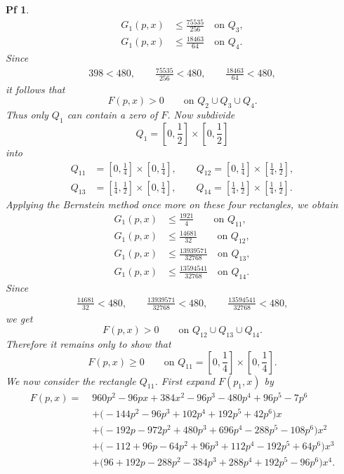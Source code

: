 \documentclass[10pt,a4paper]{amsart}
\newtheorem{pf}{Pf}
\begin{document}
\begin{pf}
\begin{align*}
G_1(p,x) &\le \frac{75535}{256} \quad \text{on } Q_3,\\[2mm]
G_1(p,x) &\le \frac{18463}{64} \quad \text{on } Q_4.
\end{align*}
Since
\begin{align*}
398<480,\qquad \frac{75535}{256}<480,\qquad \frac{18463}{64}<480,
\end{align*}
it follows that
\[
F(p,x)>0
\qquad \text{on }Q_2\cup Q_3\cup Q_4.
\]
Thus only $Q_{1}$ can contain a zero of $F$.
Now subdivide
\[
Q_1=\left[0,\frac12\right]\times\left[0,\frac12\right]
\]
into
\begin{align*}
Q_{11}&=\left[0,\frac14\right]\times\left[0,\frac14\right],\qquad
Q_{12}=\left[0,\frac14\right]\times\left[\frac14,\frac12\right],\\[3mm]
Q_{13}&=\left[\frac14,\frac12\right]\times\left[0,\frac14\right],\qquad
Q_{14}=\left[\frac14,\frac12\right]\times\left[\frac14,\frac12\right].
\end{align*}
Applying the Bernstein method once more on these four rectangles, we obtain
\begin{align*}
G_1(p,x) &\le \frac{1921}{4} \qquad \text{on } Q_{11},\\[2mm]
G_1(p,x) &\le \frac{14681}{32} \qquad \text{on } Q_{12},\\[2mm]
G_1(p,x) &\le \frac{13939571}{32768} \quad \text{on } Q_{13},\\[2mm]
G_1(p,x) &\le \frac{13594541}{32768} \quad \text{on } Q_{14}.
\end{align*}
Since
\begin{align*}
\frac{14681}{32}<480,\qquad
\frac{13939571}{32768}<480,\qquad
\frac{13594541}{32768}<480,
\end{align*}
we get
\[
F(p,x)>0
\qquad \text{on }Q_{12}\cup Q_{13}\cup Q_{14}.
\]
Therefore it remains only to show that
\[
F(p,x)\ge 0
\qquad \text{on }Q_{11}=\left[0,\frac14\right]\times\left[0,\frac14\right].
\]
We now consider the rectangle $Q_{11}$.
First expand $F(p_1, x)$ by 
\[
\begin{aligned}
F(p,x)=\;&960p^2-96px+384x^2 -96p^3-480p^4+96p^5-7p^6 \\
&+\bigl(-144p^2-96p^3+102p^4+192p^5+42p^6\bigr)x \\
&+\bigl(-192p-972p^2+480p^3+696p^4-288p^5-108p^6\bigr)x^2 \\
&+\bigl(-112+96p-64p^2+96p^3+112p^4-192p^5+64p^6\bigr)x^3 \\
&+\bigl(96+192p-288p^2-384p^3+288p^4+192p^5-96p^6\bigr)x^4.
\end{aligned}
\]
\end{pf}
\end{document}
